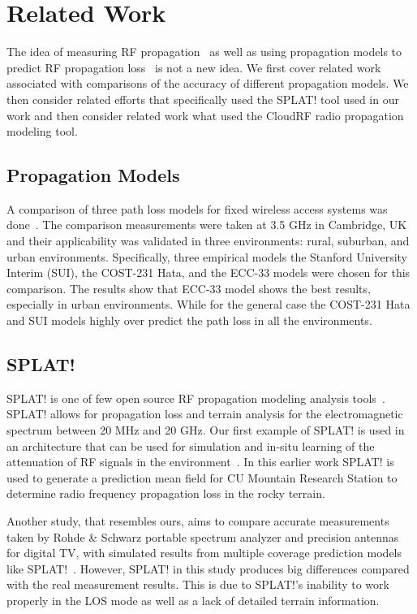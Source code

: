 
\section{Related Work}
The idea of measuring RF propagation~\cite{b8, b9} as well as using propagation models to
predict RF propagation loss~\cite{b4, b10} is not a new idea. We first cover related
work associated with comparisons of the accuracy of different propagation models.
We then consider related efforts that specifically used the SPLAT! tool used in our work
and then consider related work what used the CloudRF radio propagation modeling tool. 

\subsection{Propagation Models}
A comparison of three path loss models for fixed wireless access systems was done~\cite{b16}. The comparison
measurements were taken at 3.5 GHz in Cambridge, UK and their applicability was validated in three environments: rural, suburban,
and urban environments. Specifically, three empirical models the Stanford University Interim (SUI), the COST-231 Hata, and the ECC-33 
models were chosen for this comparison. The results show that ECC-33 model shows the best results, especially in urban environments.
While for the general case the COST-231 Hata and SUI models highly over predict the path loss in all the environments.

\subsection{SPLAT!}
SPLAT! is one of few open source RF propagation modeling analysis tools~\cite{b3}. 
SPLAT! allows for propagation loss and terrain analysis for the electromagnetic spectrum between 20 MHz and 20 GHz. Our first 
example of SPLAT! is used in an architecture that can be used for simulation and in-situ learning of the attenuation
of RF signals in the environment~\cite{b12}. In this earlier work SPLAT! is used to generate a prediction mean field for CU Mountain Research Station to determine
radio frequency propagation loss in the rocky terrain. 

Another study, that resembles ours, aims to compare accurate measurements taken by Rohde \& 
Schwarz portable spectrum analyzer and precision antennas for digital TV, with simulated results from multiple coverage prediction 
models like SPLAT!~\cite{b6}. However, SPLAT! in this study produces big differences compared with the real measurement results. This is 
due to SPLAT!'s inability to work properly in the LOS mode as well as a lack of detailed terrain information. 

